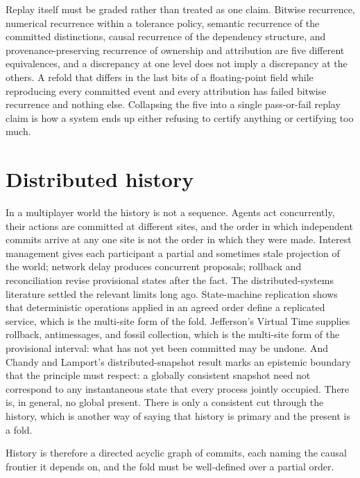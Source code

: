 \documentclass[11pt]{article}
\begin{document}
Replay itself must be graded rather than treated as one claim. Bitwise recurrence, numerical recurrence within a tolerance policy, semantic recurrence of the committed distinctions, causal recurrence of the dependency structure, and provenance-preserving recurrence of ownership and attribution are five different equivalences, and a discrepancy at one level does not imply a discrepancy at the others. A refold that differs in the last bits of a floating-point field while reproducing every committed event and every attribution has failed bitwise recurrence and nothing else. Collapsing the five into a single pass-or-fail replay claim is how a system ends up either refusing to certify anything or certifying too much.

\section{Distributed history}

In a multiplayer world the history is not a sequence. Agents act concurrently, their actions are committed at different sites, and the order in which independent commits arrive at any one site is not the order in which they were made. Interest management gives each participant a partial and sometimes stale projection of the world; network delay produces concurrent proposals; rollback and reconciliation revise provisional states after the fact. The distributed-systems literature settled the relevant limits long ago. State-machine replication shows that deterministic operations applied in an agreed order define a replicated service, which is the multi-site form of the fold. Jefferson's Virtual Time supplies rollback, antimessages, and fossil collection, which is the multi-site form of the provisional interval: what has not yet been committed may be undone. And Chandy and Lamport's distributed-snapshot result marks an epistemic boundary that the principle must respect: a globally consistent snapshot need not correspond to any instantaneous state that every process jointly occupied. There is, in general, no global present. There is only a consistent cut through the history, which is another way of saying that history is primary and the present is a fold.

History is therefore a directed acyclic graph of commits, each naming the causal frontier it depends on, and the fold must be well-defined over a partial order.
\end{document}
